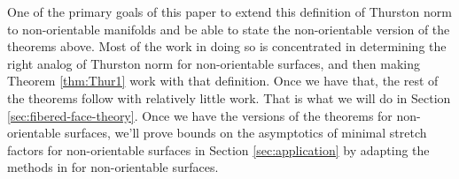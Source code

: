 One of the primary goals of this paper to extend this definition of Thurston norm to non-orientable
manifolds and be able to state the non-orientable version of the theorems above. Most of the work in
doing so is concentrated in determining the right analog of Thurston norm for non-orientable
surfaces, and then making Theorem \ref{thm:Thur1} work with that definition. Once we have that, the
rest of the theorems follow with relatively little work. That is what we will do in Section
\ref{sec:fibered-face-theory}. Once we have the versions of the theorems for non-orientable surfaces,
we'll prove bounds on the asymptotics of minimal stretch factors for non-orientable surfaces in Section
\ref{sec:application} by adapting the methods in \cite{yazdi2018pseudo} for non-orientable surfaces.
